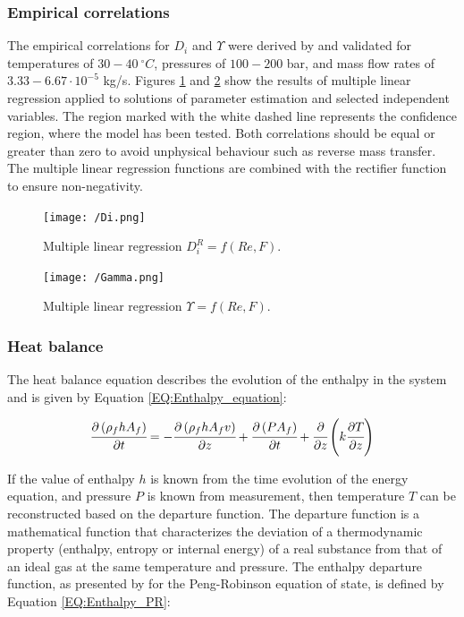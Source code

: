 \documentclass[a4paper,fleqn]{cas-dc}
\begin{document}
	\subsubsection{Empirical correlations}
	
	The empirical correlations for $D_i$ and $\Upsilon$ were derived by \citet{Sliczniuk2024} and validated for temperatures of $30 - 40~^\circ C$, pressures of $100 - 200$ bar, and mass flow rates of $3.33-6.67 \cdot 10^{-5}$ kg/s. Figures \ref{fig:Correlation_Di} and \ref{fig:Correlation_Gamma} show the results of multiple linear regression applied to solutions of parameter estimation and selected independent variables. The region marked with the white dashed line represents the confidence region, where the model has been tested. Both correlations should be equal or greater than zero to avoid unphysical behaviour such as  reverse mass transfer. The multiple linear regression functions are combined with the rectifier function to ensure non-negativity.
	
	\begin{figure}[!ht]
		\centering
		\texttt{[image: /Di.png]}
		\caption{Multiple linear regression $D_i^R = f(Re, F).$}
		\label{fig:Correlation_Di}
	\end{figure}
	
	\begin{figure}[!ht]
		\centering
		\texttt{[image: /Gamma.png]}
		\caption{Multiple linear regression $\Upsilon = f(Re, F).$}
		\label{fig:Correlation_Gamma}
	\end{figure}
	
	\subsubsection{Heat balance} \label{CH: heat_balance}
	
	The heat balance equation describes the evolution of the enthalpy in the system and is given by Equation \ref{EQ:Enthalpy_equation}:
	
	{\footnotesize
		\begin{equation} \label{EQ:Enthalpy_equation}
			\cfrac{\partial \left(\rho_f {\color{black}h} A_f\right)}{\partial t} = - \cfrac{\partial \left( \rho_f {\color{black}h} A_f v \right)}{\partial z} + \cfrac{\partial \left(P A_f\right)}{\partial t} + \cfrac{\partial}{\partial z} \left( k \cfrac{\partial T}{\partial z} \right)
		\end{equation}
	}
	
	If the value of enthalpy $h$ is known from the time evolution of the energy equation, and pressure $P$ is known from measurement, then temperature $T$ can be reconstructed based on the departure function. The departure function is a mathematical function that characterizes the deviation of a thermodynamic property (enthalpy, entropy or internal energy) of a real substance from that of an ideal gas at the same temperature and pressure. The enthalpy departure function, as presented by \citet{Gmehling2019} for the Peng-Robinson equation of state,  is defined by Equation \ref{EQ:Enthalpy_PR}:
	
\end{document}
